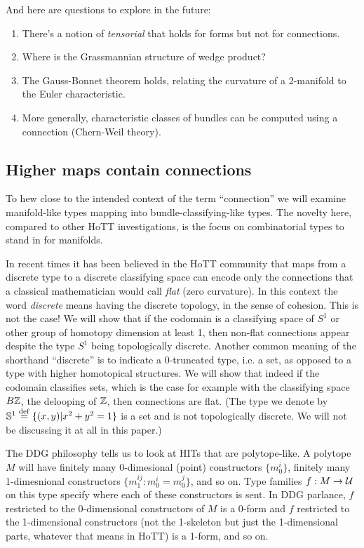 And here are questions to explore in the future:

\begin{enumerate}
\item
  There's a notion of \emph{tensorial} that holds for forms but not for
  connections.
\item
  Where is the Grassmannian structure of wedge product?
\item
  The Gauss-Bonnet theorem holds, relating the curvature of a 2-manifold
  to the Euler characteristic.
\item
  More generally, characteristic classes of bundles can be computed
  using a connection (Chern-Weil theory).
\end{enumerate}

\subsection{Higher maps contain
connections}\label{higher-maps-contain-connections}

To hew close to the intended context of the term ``connection'' we will
examine manifold-like types mapping into bundle-classifying-like types.
The novelty here, compared to other HoTT investigations, is the focus on
combinatorial types to stand in for manifolds.

In recent times it has been believed in the HoTT community that maps
from a discrete type to a discrete classifying space can encode only the
connections that a classical mathematician would call \emph{flat} (zero
curvature). In this context the word \emph{discrete} means having the
discrete topology, in the sense of cohesion\cite{shulman_cohesion}. This
is not the case! We will show that if the codomain is a classifying
space of \(S^1\) or other group of homotopy dimension at least 1, then
non-flat connections appear despite the type \(S^1\) being topologically
discrete. Another common meaning of the shorthand ``discrete'' is to
indicate a 0-truncated type, i.e. a set, as opposed to a type with
higher homotopical structures. We will show that indeed if the codomain
classifies sets, which is the case for example with the classifying
space \(B\mathbb{Z}\), the delooping of \(\mathbb{Z}\), then connections are flat.
(The type we denote by \(\mathbb{S}^1\stackrel{\mathrm{def}}{=}\{(x, y)|x^2+y^2=1\}\) is a
set and is not topologically discrete. We will not be discussing it at
all in this paper.)

The DDG philosophy tells us to look at HITs that are polytope-like. A
polytope \(M\) will have finitely many 0-dimesional (point) constructors
\(\{m_0^i\}\), finitely many 1-dimesnional constructors
\(\{m_1^{ij}:m_0^i=m_0^j\}\), and so on. Type families \(f:M\to \mathcal{U}\) on
this type specify where each of these constructors is sent. In DDG
parlance, \(f\) restricted to the 0-dimensional constructors of \(M\) is
a 0-form and \(f\) restricted to the 1-dimensional constructors (not the
1-skeleton but just the 1-dimensional parts, whatever that means in
HoTT) is a 1-form, and so on.

